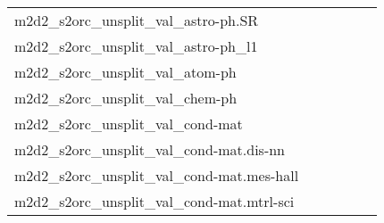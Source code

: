 {\begin{longtable}{m{6cm}m{1.7cm}m{1.7cm}m{1.7cm}m{1.7cm}m{1.7cm}}
	m2d2\_s2orc\_unsplit\_val\_astro-ph.SR  & \colorbox[HTML]{e7f5ad}{\makebox[\mywidth][c]{13.08}} & \colorbox[HTML]{e6f5ad}{\makebox[\mywidth][c]{13.08}} & \colorbox[HTML]{ffffe5}{\makebox[\mywidth][c]{14.89}} & \colorbox[HTML]{b8e293}{\makebox[\mywidth][c]{12.86}} & \colorbox[HTML]{77c578}{\makebox[\mywidth][c]{12.70}}\\
	m2d2\_s2orc\_unsplit\_val\_astro-ph\_l1  & \colorbox[HTML]{ecf7b1}{\makebox[\mywidth][c]{15.36}} & \colorbox[HTML]{e8f6ae}{\makebox[\mywidth][c]{15.33}} & \colorbox[HTML]{ffffe5}{\makebox[\mywidth][c]{17.16}} & \colorbox[HTML]{d9f0a3}{\makebox[\mywidth][c]{15.21}} & \colorbox[HTML]{77c578}{\makebox[\mywidth][c]{14.92}}\\
	m2d2\_s2orc\_unsplit\_val\_atom-ph  & \colorbox[HTML]{d0ec9e}{\makebox[\mywidth][c]{12.74}} & \colorbox[HTML]{e3f4aa}{\makebox[\mywidth][c]{12.84}} & \colorbox[HTML]{ffffe5}{\makebox[\mywidth][c]{14.44}} & \colorbox[HTML]{d1ec9f}{\makebox[\mywidth][c]{12.75}} & \colorbox[HTML]{77c578}{\makebox[\mywidth][c]{12.53}}\\
	m2d2\_s2orc\_unsplit\_val\_chem-ph  & \colorbox[HTML]{ccea9c}{\makebox[\mywidth][c]{13.20}} & \colorbox[HTML]{ddf1a6}{\makebox[\mywidth][c]{13.29}} & \colorbox[HTML]{ffffe5}{\makebox[\mywidth][c]{15.22}} & \colorbox[HTML]{bde395}{\makebox[\mywidth][c]{13.14}} & \colorbox[HTML]{77c578}{\makebox[\mywidth][c]{12.97}}\\
	m2d2\_s2orc\_unsplit\_val\_cond-mat  & \colorbox[HTML]{c6e89a}{\makebox[\mywidth][c]{11.67}} & \colorbox[HTML]{e1f3a9}{\makebox[\mywidth][c]{11.78}} & \colorbox[HTML]{ffffe5}{\makebox[\mywidth][c]{13.37}} & \colorbox[HTML]{c3e698}{\makebox[\mywidth][c]{11.67}} & \colorbox[HTML]{77c578}{\makebox[\mywidth][c]{11.50}}\\
	m2d2\_s2orc\_unsplit\_val\_cond-mat.dis-nn  & \colorbox[HTML]{bfe596}{\makebox[\mywidth][c]{12.54}} & \colorbox[HTML]{e1f3a9}{\makebox[\mywidth][c]{12.67}} & \colorbox[HTML]{ffffe5}{\makebox[\mywidth][c]{14.28}} & \colorbox[HTML]{ccea9c}{\makebox[\mywidth][c]{12.58}} & \colorbox[HTML]{77c578}{\makebox[\mywidth][c]{12.38}}\\
	m2d2\_s2orc\_unsplit\_val\_cond-mat.mes-hall  & \colorbox[HTML]{b3df91}{\makebox[\mywidth][c]{11.24}} & \colorbox[HTML]{ebf7b0}{\makebox[\mywidth][c]{11.50}} & \colorbox[HTML]{ffffe5}{\makebox[\mywidth][c]{13.19}} & \colorbox[HTML]{c6e89a}{\makebox[\mywidth][c]{11.30}} & \colorbox[HTML]{77c578}{\makebox[\mywidth][c]{11.10}}\\
	m2d2\_s2orc\_unsplit\_val\_cond-mat.mtrl-sci  & \colorbox[HTML]{d7efa2}{\makebox[\mywidth][c]{12.19}} & \colorbox[HTML]{ecf7b1}{\makebox[\mywidth][c]{12.33}} & \colorbox[HTML]{ffffe5}{\makebox[\mywidth][c]{14.09}} & \colorbox[HTML]{d4eea0}{\makebox[\mywidth][c]{12.18}} & \colorbox[HTML]{77c578}{\makebox[\mywidth][c]{11.91}}\\

\end{longtable}}
